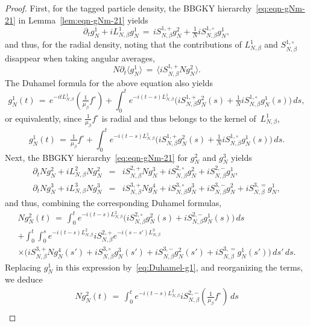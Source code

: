 \documentclass[a4paper,11pt,reqno,noindent]{amsart}
\theoremstyle{plain}
\numberwithin{equation}{section}
\newcommand{\3}{|\!|\!|}
\begin{document}
\begin{proof}
First, for the tagged particle density, the BBGKY hierarchy~\eqref{eq:eqn-gNm-21} in Lemma~\ref{lem:eqn-gNm-21} yields
\[\partial_tg_N^1+iL_{N,\beta}^1g_N^1\,=\,iS_{N,\beta}^{1,+}g_N^2+\tfrac1NiS_{N,\beta}^{1,\circ}g_N^1,\]
and thus, for the radial density, noting that the contributions of $L_{N,\beta}^1$ and $S_{N,\beta}^{1,\circ}$ disappear when taking angular averages,
\begin{equation}\label{eq:gN1-1-NG}
N\partial_t\langle g_N^1\rangle\,=\,\langle iS_{N,\beta}^{1,+}Ng_N^2\rangle.
\end{equation}
The Duhamel formula for the above equation also yields
\[g_N^{1}(t)\,=\,e^{-itL_{N,\beta}^1}(\tfrac1{\mu_\beta}f^\circ)+\int_0^te^{-i(t-s)L_{N,\beta}^1}\Big(iS_{N,\beta}^{1,+}g_N^{2}(s)+\tfrac1NiS_{N,\beta}^{1,\circ}g_N^{1}(s)\Big)\,ds,\]
or equivalently, since $\tfrac1{\mu_\beta}f^\circ$ is radial and thus belongs to the kernel of~$L_{N,\beta}^1$,
\begin{equation}\label{eq:Duhamel-g1}
g_N^{1}(t)\,=\,\tfrac1{\mu_\beta}f^\circ+\int_0^te^{-i(t-s)L_{N,\beta}^1}\Big(iS_{N,\beta}^{1,+}g_N^{2}(s)+\tfrac1NiS_{N,\beta}^{1,\circ}g_N^{1}(s)\Big)\,ds.
\end{equation}
Next, the BBGKY hierarchy~\eqref{eq:eqn-gNm-21} for $g_N^2$ and $g_N^3$ yields
\begin{eqnarray*}
\partial_tNg_N^2+iL_{N,\beta}^2Ng_N^2&=&iS_{N,\beta}^{2,+}Ng_N^3+iS_{N,\beta}^{2,\circ}g_N^2+iS_{N,\beta}^{2,-}g_N^1,\\
\partial_tNg_N^3+iL_{N,\beta}^3Ng_N^3&=&iS_{N,\beta}^{3,+}Ng_N^4+iS_{N,\beta}^{3,\circ}g_N^3+iS_{N,\beta}^{3,-}g_N^2+iS_{N,\beta}^{3,=}g_N^1,
\end{eqnarray*}
and thus, combining the corresponding Duhamel formulas,
\begin{multline*}
Ng_N^{2}(t)\,=\,\int_0^te^{-i(t-s)L_{N,\beta}^2}\Big(iS_{N,\beta}^{2,\circ}g_N^{2}(s)+iS_{N,\beta}^{2,-}g_N^{1}(s)\Big)\,ds\\
+\int_0^t\int_0^se^{-i(t-s)L_{N,\beta}^2}iS_{N,\beta}^{2,+}e^{-i(s-s')L_{N,\beta}^3}\\
\times\Big(iS_{N,\beta}^{3,+}Ng_N^{4}(s')+iS_{N,\beta}^{3,\circ}g_N^{3}(s')+iS_{N,\beta}^{3,-}g_N^{2}(s')+iS_{N,\beta}^{3,=}g_N^{1}(s')\Big)\,ds'\,ds.
\end{multline*}
Replacing $g_N^{1}$ in this expression by~\eqref{eq:Duhamel-g1}, and reorganizing the terms, we deduce
\begingroup\allowdisplaybreaks
\begin{multline*}
Ng_N^{2}(t)\,=\,\int_0^te^{-i(t-s)L_{N,\beta}^2} iS_{N,\beta}^{2,-}(\tfrac1{\mu_\beta}f^\circ)\,ds\\

\end{multline*}
\end{proof}
\end{document}
